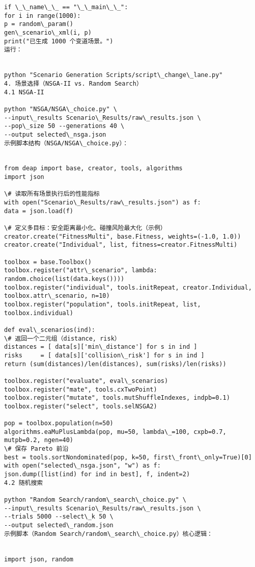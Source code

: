 \begin{lstlisting}
if \_\_name\_\_ == "\_\_main\_\_":
for i in range(1000):
p = random\_param()
gen\_scenario\_xml(i, p)
print("已生成 1000 个变道场景。")
运行：
  	
  	
python "Scenario Generation Scripts/script\_change\_lane.py"
4. 场景选择（NSGA-II vs. Random Search）
4.1 NSGA-II
  	
python "NSGA/NSGA\_choice.py" \
--input\_results Scenario\_Results/raw\_results.json \
--pop\_size 50 --generations 40 \
--output selected\_nsga.json
示例脚本结构（NSGA/NSGA\_choice.py）：
  	
  	
from deap import base, creator, tools, algorithms
import json
  	
\# 读取所有场景执行后的性能指标
with open("Scenario\_Results/raw\_results.json") as f:
data = json.load(f)
  	
\# 定义多目标：安全距离最小化、碰撞风险最大化（示例）
creator.create("FitnessMulti", base.Fitness, weights=(-1.0, 1.0))
creator.create("Individual", list, fitness=creator.FitnessMulti)
  	
toolbox = base.Toolbox()
toolbox.register("attr\_scenario", lambda: random.choice(list(data.keys())))
toolbox.register("individual", tools.initRepeat, creator.Individual, toolbox.attr\_scenario, n=10)
toolbox.register("population", tools.initRepeat, list, toolbox.individual)
  	
def eval\_scenarios(ind):
\# 返回一个二元组（distance, risk）
distances = [ data[s]['min\_distance'] for s in ind ]
risks     = [ data[s]['collision\_risk'] for s in ind ]
return (sum(distances)/len(distances), sum(risks)/len(risks))
  	
toolbox.register("evaluate", eval\_scenarios)
toolbox.register("mate", tools.cxTwoPoint)
toolbox.register("mutate", tools.mutShuffleIndexes, indpb=0.1)
toolbox.register("select", tools.selNSGA2)
  	
pop = toolbox.population(n=50)
algorithms.eaMuPlusLambda(pop, mu=50, lambda\_=100, cxpb=0.7, mutpb=0.2, ngen=40)
\# 保存 Pareto 前沿
best = tools.sortNondominated(pop, k=50, first\_front\_only=True)[0]
with open("selected\_nsga.json", "w") as f:
json.dump([list(ind) for ind in best], f, indent=2)
4.2 随机搜索
  	
python "Random Search/random\_search\_choice.py" \
--input\_results Scenario\_Results/raw\_results.json \
--trials 5000 --select\_k 50 \
--output selected\_random.json
示例脚本（Random Search/random\_search\_choice.py）核心逻辑：
  	
  	
import json, random
  	

\end{lstlisting}
